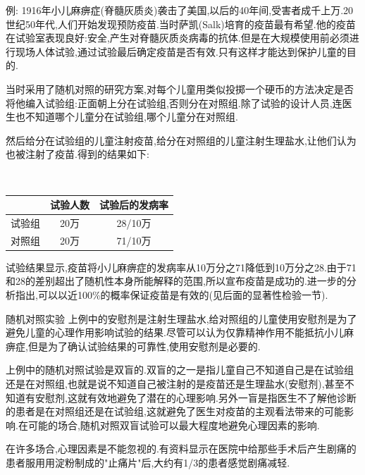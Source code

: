 	\begin{frame}
		例: 1916年小儿麻痹症(脊髓灰质炎)袭击了美国,以后的40年间,受害者成千上万.20世纪50年代,人们开始发现预防疫苗.当时萨凯(Salk)培育的疫苗最有希望.他的疫苗在试验室表现良好:安全,产生对脊髓灰质炎病毒的抗体.但是在大规模使用前必须进行现场人体试验,通过试验最后确定疫苗是否有效.只有这样才能达到保护儿童的目的.
		
		当时采用了随机对照的研究方案,对每个儿童用类似投掷一个硬币的方法决定是否将他编入试验组:正面朝上分在试验组,否则分在对照组.除了试验的设计人员,连医生也不知道哪个儿童分在试验组,哪个儿童分在对照组.
		
		然后给分在试验组的儿童注射疫苗,给分在对照组的儿童注射生理盐水,让他们认为也被注射了疫苗.得到的结果如下:
		
		$\quad\quad\quad\quad$\begin{tabular}{|c|c|c|}
			\hline & 试验人数 & 试验后的发病率 \\
			\hline 试验组 & 20万 & 28/10万 \\
			\hline 对照组 & 20万 & 71/10万 \\
			\hline
		\end{tabular}
	
		试验结果显示,疫苗将小儿麻痹症的发病率从10万分之71降低到10万分之28.由于71和28的差别超出了随机性本身所能解释的范围,所以宣布疫苗是成功的.进一步的分析指出,可以以近100\%的概率保证疫苗是有效的(见后面的显著性检验一节).
	\end{frame}
	
	\begin{frame}{随机对照实验}
		上例中的安慰剂是注射生理盐水,给对照组的儿童使用安慰剂是为了避免儿童的心理作用影响试验的结果.尽管可以认为仅靠精神作用不能抵抗小儿麻痹症,但是为了确认试验结果的可靠性,使用安慰剂是必要的.
		
		上例中的随机对照试验是双盲的.双盲的之一是指儿童自己不知道自己是在试验组还是在对照组,也就是说不知道自己被注射的是疫苗还是生理盐水(安慰剂),甚至不知道有安慰剂,这就有效地避免了潜在的心理影响.另外一盲是指医生不了解他诊断的患者是在对照组还是在试验组,这就避免了医生对疫苗的主观看法带来的可能影响.在可能的场合,随机对照双盲试验可以最大程度地避免心理因素的影响.
		
		在许多场合,心理因素是不能忽视的.有资料显示在医院中给那些手术后产生剧痛的患者服用用淀粉制成的"止痛片"后,大约有1/3的患者感觉剧痛减轻.		
	\end{frame}

